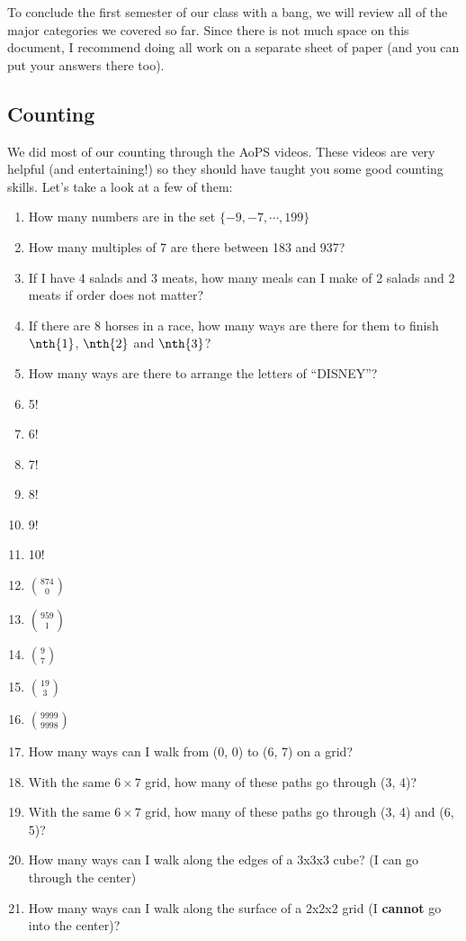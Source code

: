 To conclude the first semester of our class with a bang, we will review all of the major categories we covered so far. Since there is not much space on this document, I recommend doing all work on a separate sheet of paper (and you can put your answers there too).
	\subsection{Counting}
		We did most of our counting through the AoPS videos. These videos are very helpful (and entertaining!) so they should have taught you some good counting skills. Let's take a look at a few of them:
		\begin{enumerate}
			\item How many numbers are in the set $\{-9, -7, \cdots, 199\}$
			\item How many multiples of 7 are there between 183 and 937?
			\item If I have 4 salads and 3 meats, how many meals can I make of 2 salads and 2 meats if order does not matter?
			\item If there are 8 horses in a race, how many ways are there for them to finish $\nth{1}$, $\nth{2}$ and $\nth{3}$? 
			\item How many ways are there to arrange the letters of ``DISNEY''?
			\item 5!
			\item 6!
			\item 7!
			\item 8!
			\item 9!
			\item 10!
			\item ${874 \choose 0}$ 
			\item ${959 \choose 1}$ 
			\item ${9 \choose 7}$ 
			\item ${19 \choose 3}$ 
			\item ${9999 \choose 9998}$ 
			\item How many ways can I walk from (0, 0) to (6, 7) on a grid?
			\item With the same $6 \times 7$ grid, how many of these paths go through (3, 4)?
			\item With the same $6 \times 7$ grid, how many of these paths go through (3, 4) and (6, 5)?
			\item How many ways can I walk along the edges of a 3x3x3 cube? (I can go through the center)
			\item How many ways can I walk along the surface of a 2x2x2 grid (I \textbf{cannot} go into the center)?
		\end{enumerate}
